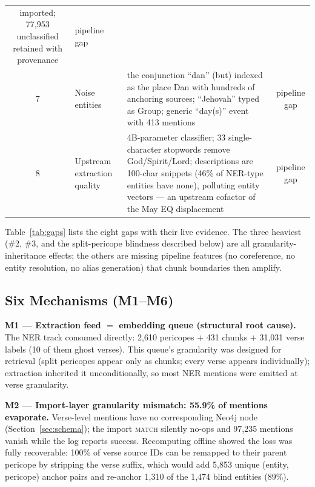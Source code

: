 \begin{table}[!t]
\begin{threeparttable}
\begin{tabular}{@{}clp{9.7cm}c@{}}
    imported; 77{,}953 unclassified retained with provenance & pipeline
    gap \\
7 & Noise entities & the conjunction ``dan'' (but) indexed as the place
    Dan with hundreds of anchoring sources; ``Jehovah'' typed as Group;
    generic ``day(s)'' event with 413 mentions & pipeline gap \\
8 & Upstream extraction quality & 4B-parameter classifier; 33
    single-character stopwords remove God/Spirit/Lord; descriptions are
    100-char snippets (46\% of NER-type entities have none), polluting
    entity vectors --- an upstream cofactor of the May EQ displacement &
    pipeline gap \\
\bottomrule
\end{tabular}
\end{threeparttable}
\end{table}

Table~\ref{tab:gaps} lists the eight gaps with their live evidence. The
three heaviest (\#2, \#3, and the split-pericope blindness described
below) are all granularity-inheritance effects; the others are missing
pipeline features (no coreference, no entity resolution, no alias
generation) that chunk boundaries then amplify.

\subsection{Six Mechanisms (M1--M6)}

\textbf{M1 --- Extraction feed $=$ embedding queue (structural root
cause).} The NER track consumed  directly:
2{,}610 pericopes $+$ 431 chunks $+$ 31{,}031 verse labels (10 of them ghost verses). This queue's
granularity was designed for retrieval (split pericopes appear only as
chunks; every verse appears individually); extraction inherited it
unconditionally, so most NER mentions were emitted at verse granularity.

\textbf{M2 --- Import-layer granularity mismatch: 55.9\% of mentions
evaporate.} Verse-level mentions have no corresponding Neo4j node
(Section~\ref{sec:schema}); the import \textsc{match} silently no-ops
and 97{,}235 mentions vanish while the log reports success. Recomputing
offline showed the loss was fully recoverable: 100\% of verse source IDs
can be remapped to their parent pericope by stripping the verse suffix,
which would add 5{,}853 unique (entity, pericope) anchor pairs and
re-anchor 1{,}310 of the 1{,}474 blind entities (89\%).

